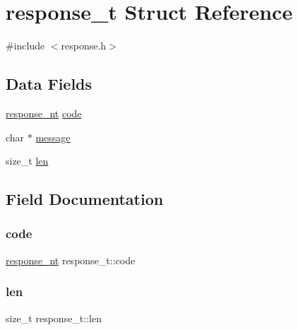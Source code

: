 \hypertarget{structresponse__t}{}\section{response\+\_\+t Struct Reference}
\label{structresponse__t}


{\ttfamily \#include $<$response.\+h$>$}

\subsection*{Data Fields}
\begin{DoxyCompactItemize}
\item 
\mbox{\hyperlink{response_8h_a0b13748b574460b8784b7a521757b4b5}{response\+\_\+nt}} \mbox{\hyperlink{structresponse__t_ab17a095d391dd03ba09ed21fc54fd760}{code}}
\item 
char $\ast$ \mbox{\hyperlink{structresponse__t_a9667b0741537bcef38ec1616119302bf}{message}}
\item 
size\+\_\+t \mbox{\hyperlink{structresponse__t_abc8b9842fe4af48e9204bd0b5881da60}{len}}
\end{DoxyCompactItemize}


\subsection{Field Documentation}
\mbox{\label{structresponse__t_ab17a095d391dd03ba09ed21fc54fd760}} 
\subsubsection{\texorpdfstring{code}{code}}
{\footnotesize\ttfamily \mbox{\hyperlink{response_8h_a0b13748b574460b8784b7a521757b4b5}{response\+\_\+nt}} response\+\_\+t\+::code}

\mbox{\label{structresponse__t_abc8b9842fe4af48e9204bd0b5881da60}} 
\subsubsection{\texorpdfstring{len}{len}}
{\footnotesize\ttfamily size\+\_\+t response\+\_\+t\+::len}

